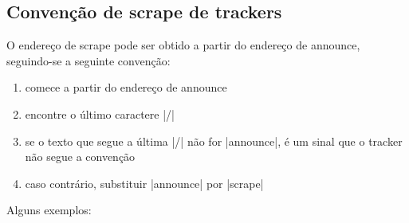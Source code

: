 \subsection*{Convenção de scrape de trackers}

O endereço de \gls*{scrape} pode ser obtido a partir do endereço de \gls*{announce},
seguindo-se a seguinte convenção:

\begin{enumerate}
    \item comece a partir do endereço de \gls*{announce}

    \item encontre o último caractere \bverb|/|

    \item se o texto que segue a última \bverb|/| não for \sverb|announce|, é um sinal
    que o \gls*{tracker} não segue a convenção

    \item caso contrário, substituir \sverb|announce| por \sverb|scrape|
\end{enumerate}

Alguns exemplos:

